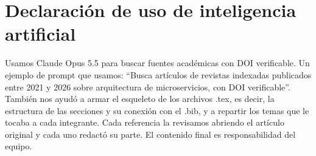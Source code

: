 \section{Declaración de uso de inteligencia artificial}\label{sec:ia}
Usamos Claude Opus 5.5 para buscar fuentes académicas con DOI verificable. Un ejemplo de prompt que usamos: \enquote{Busca artículos de revistas indexadas publicados entre 2021 y 2026 sobre arquitectura de microservicios, con DOI verificable}. También nos ayudó a armar el esqueleto de los archivos .tex, es decir, la estructura de las secciones y su conexión con el .bib, y a repartir los temas que le tocaba a cada integrante. Cada referencia la revisamos abriendo el artículo original y cada uno redactó su parte. El contenido final es responsabilidad del equipo.
